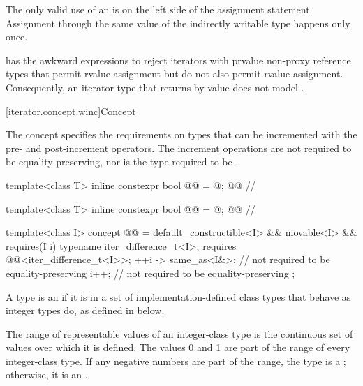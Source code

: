 \pnum
\begin{note}
The only valid use of an  is on the left side of the assignment statement.
Assignment through the same value of the indirectly writable type happens only once.
\end{note}

\pnum
\begin{note}
 has the awkward  expressions to reject
iterators with prvalue non-proxy reference types that permit rvalue
assignment but do not also permit  rvalue assignment.
Consequently, an iterator type  that returns 
by value does not model .
\end{note}

[iterator.concept.winc]{Concept }

\pnum
The  concept specifies the requirements on
types that can be incremented with the pre- and post-increment operators.
The increment operations are not required to be equality-preserving,
nor is the type required to be .

\begin{codeblock}
template<class T>
  inline constexpr bool @@ = @\seebelow@; @\itcorr[-2]@           // \expos

template<class T>
  inline constexpr bool @@ = @\seebelow@; @\itcorr[-2]@    // \expos

template<class I>
  concept @@ =
    default_constructible<I> && movable<I> &&
    requires(I i) {
      typename iter_difference_t<I>;
      requires @@<iter_difference_t<I>>;
      { ++i } -> same_as<I&>;   // not required to be equality-preserving
      i++;                      // not required to be equality-preserving
    };
\end{codeblock}

\pnum
A type  is an 
if it is in a set of implementation-defined class types
that behave as integer types do, as defined in below.

\pnum
The range of representable values of an integer-class type
is the continuous set of values over which it is defined.
The values 0 and 1 are part of the range of every integer-class type.
If any negative numbers are part of the range,
the type is a ;
otherwise, it is an .

